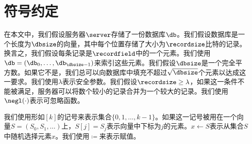 \section{符号约定}
在本文中，我们假设服务器$\server$存储了一份数据库$\db$。我们假设数据库是一个长度为$\dbsize$的向量，其中每个位置存储了大小为$\recordsize$比特的记录。换言之，我们假设每条记录是$\recordfield$中的一个元素。我们使用$\db = (\db_0,\dots,\db_{\dbsize-1})$来索引这些元素。我们假设$\dbsize$是一个完全平方数。如果它不是，我们总可以向数据库中填充不超过$\sqrt{\dbsize}$个元素以达成这一要求。我们使用$\lambda$表示安全参数。我们假设$\recordsize \ge \lambda$，如果这一条件不能被满足，服务器可以将数个较小的记录合并为一个较大的记录。我们使用$\negl(\cdot)$表示可忽略函数。

我们使用形如$[k]$的记号来表示集合$\{0,1,\dots,k-1\}$。如果这一记号被用在一个向量$S = (S_0, S_1, \dots)$上，$S[j]=S_j$表示向量中下标为$j$的元素。$x\leftarrow S$表示从集合$S$中随机选择元素$x$。我们使用$\coloneqq$来表示赋值。
